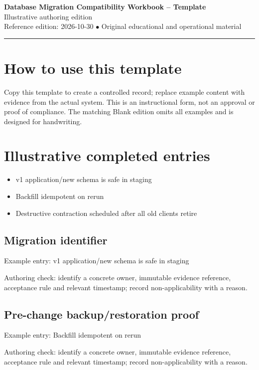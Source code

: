 \documentclass[10pt,letterpaper]{article}
\begin{document}
\begin{center}
{\LARGE\bfseries\color{cdblue}Database Migration Compatibility Workbook -- Template}\\[7pt]
{\large Illustrative authoring edition}\\[6pt]
{\small Reference edition: 2026-10-30 $\bullet$ Original educational and operational material}
\end{center}
\noindent\color{cdblue}\rule{\linewidth}{1.2pt}\color{black}
\vspace{0.4em}
\section{How to use this template}
Copy this template to create a controlled record; replace example content with evidence from the actual system. This is an instructional form, not an approval or proof of compliance. The matching Blank edition omits all examples and is designed for handwriting.


\section{Illustrative completed entries}
\begin{itemize}
\item v1 application/new schema is safe in staging
\item Backfill idempotent on rerun
\item Destructive contraction scheduled after all old clients retire
\end{itemize}

\subsection{Migration identifier}
Example entry: v1 application/new schema is safe in staging

Authoring check: identify a concrete owner, immutable evidence reference, acceptance rule and relevant timestamp; record non-applicability with a reason.


\subsection{Pre-change backup/restoration proof}
Example entry: Backfill idempotent on rerun

Authoring check: identify a concrete owner, immutable evidence reference, acceptance rule and relevant timestamp; record non-applicability with a reason.
\end{document}
